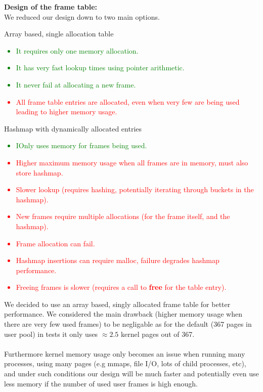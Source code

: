 \documentclass{report}
\newcommand{\fun}[1]{\textcolor{Emerald}{\textbf{#1}}}
\newcommand{\compitem}[1]{\begin{itemize}\setlength\itemsep{-0.5em}#1\end{itemize}}
\begin{document}
				\textbf{Design of the frame table:}
				\\ We reduced our design down to two main options.
				\\ \begin{minipage}[t]{0.45\textwidth}
					\centerline{Array based, single allocation table}
					\textcolor{green}{
						\compitem{
							\item It requires only one memory allocation.
							\item It has very fast lookup times using pointer
							arithmetic.
							\item It never fail at allocating a new frame.
						}
					}
					\textcolor{red}{
						\compitem{
							\item All frame table entries are allocated, even 
							when very few are being used leading to higher 
							memory usage.
						}
					}
				\end{minipage}
				\hfill
				\begin{minipage}[t]{0.45\textwidth}
					\centerline{Hashmap with dynamically allocated entries}
					\textcolor{green}{
						\compitem{
							\item IOnly uses memory for frames being used.
						}
					}
					\textcolor{Red}{
						\compitem{
							\item Higher maximum memory usage when all frames are in memory, must also store hashmap.
							\item Slower lookup (requires hashing, potentially iterating through buckets in the hashmap).
							\item New frames require multiple allocations (for the frame itself, and the hashmap).
							\item Frame allocation can fail.
							\item Hashmap insertions can require malloc, failure degrades hashmap performance.
							\item Freeing frames is slower (requires a call to \fun{free} for the table entry).
						}
					}
				\end{minipage}
				We decided to use an array based, singly allocated frame table for better 
				performance. We considered the main drawback (higher memory usage when there 
				are very few used frames) to be negligable as for the default  (367 pages 
				in user pool) in tests it only uses $\approx 2.5$ kernel pages out of 367.
				\\
				\\ Furthermore kernel memory usage only becomes an issue when running many 
				processes, using many pages (e.g mmaps, file I/O, lots of child processes,
				etc), and under such conditions our design will be much faster and potentially 
				even use less memory if the number of used user frames is high enough.
				
\end{document}
